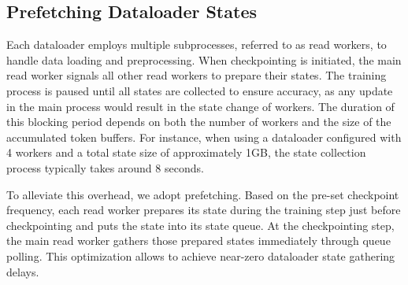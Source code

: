 \subsection{Prefetching Dataloader States}
\label{sec:dataloader_prefetch}
Each dataloader employs multiple subprocesses, referred to as read workers,
to handle data loading and preprocessing.
When checkpointing is initiated, the main read worker
signals all 
other read workers to prepare their states. The training process is paused until all states are collected to ensure accuracy, as any update in the main process would result in the state change of workers.  %
The duration of this blocking period depends on both the number of workers and the size of the accumulated token buffers.
For instance, when using a dataloader configured with 4 workers and a total state size of approximately 1GB, the state collection process typically takes around 8 seconds.

To alleviate this overhead, we adopt prefetching. 
Based on the pre-set checkpoint frequency, each read worker prepares its state during the training step just before checkpointing and puts the state into its state queue.
At the checkpointing step, the main read worker gathers those prepared states immediately through queue polling.
This optimization allows \sys{} to achieve near-zero dataloader state gathering delays.
